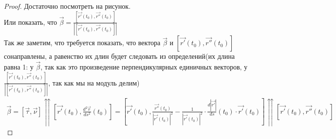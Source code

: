 \begin{proof}
	Достаточно посмотреть на рисунок.\\
	Или показать, что $\vec{\beta} = \frac{[\vec{r'}(t_0), \vec{r''}(t_0)]}{|[\vec{r'}(t_0), \vec{r''}(t_0)]|}$\\
	Так же заметим, что требуется показать, что вектора $\vec{\beta}$ и $[\vec{r'}(t_0), \vec{r''}(t_0)]$ сонаправлены, а равенство их длин будет следовать из определений(их длина равна 1: у $\vec{\beta}$, так как это произведение перпендикулярных единичных векторов, у $\frac{[\vec{r'}(t_0), \vec{r''}(t_0)]}{|[\vec{r'}(t_0), \vec{r''}(t_0)]|}$, так как мы на модуль делим)\\
	\begin{align*}
		\vec{\beta} = [\vec{\tau}, \vec{\nu}] \upuparrows \left[\vec{r'}(t_0), \frac{d^2\vec{r}}{ds^2}(t_0)\right] = \left[\vec{r'}(t_0), \frac{\vec{r''}(t_0)}{\left|\vec{r'}(t_0)\right|^2} - \frac{1}{\left|\vec{r'}(t_0)\right|^2} \cdot \frac{d\left|\vec{r'}\right|}{ds}(t_0) \cdot \vec{r'}(t_0)\right] \upuparrows [\vec{r'}(t_0), \vec{r''}(t_0)]
	\end{align*}
	
\end{proof}